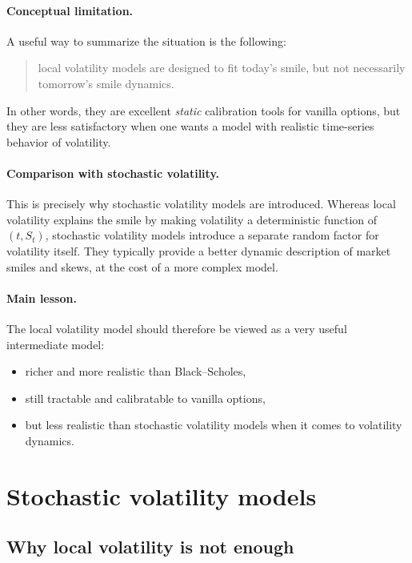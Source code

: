 \documentclass[11pt]{article}
\theoremstyle{plain}
\theoremstyle{definition}
\theoremstyle{remark}
\begin{document}
\paragraph{Conceptual limitation.}
A useful way to summarize the situation is the following:
\begin{quote}
local volatility models are designed to fit today's smile, but not
necessarily tomorrow's smile dynamics.
\end{quote}

In other words, they are excellent \emph{static} calibration tools for
vanilla options, but they are less satisfactory when one wants a model
with realistic time-series behavior of volatility.

\paragraph{Comparison with stochastic volatility.}
This is precisely why stochastic volatility models are introduced.
Whereas local volatility explains the smile by making volatility a
deterministic function of \((t,S_t)\), stochastic volatility models
introduce a separate random factor for volatility itself.
They typically provide a better dynamic description of market smiles and
skews, at the cost of a more complex model.

\paragraph{Main lesson.}
The local volatility model should therefore be viewed as a very useful
intermediate model:
\begin{itemize}[leftmargin=1.4em]
    \item richer and more realistic than Black--Scholes,
    \item still tractable and calibratable to vanilla options,
    \item but less realistic than stochastic volatility models when it
    comes to volatility dynamics.
\end{itemize}

\section{Stochastic volatility models}

\subsection{Why local volatility is not enough}
\end{document}
